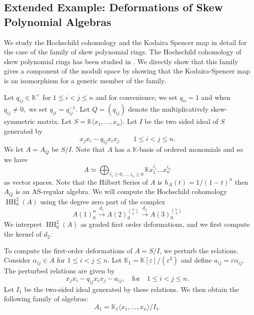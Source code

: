 \documentclass{amsart}
\def\HH{\operatorname{HH}}
\begin{document}
\subsection{Extended Example: Deformations of Skew Polynomial Algebras}
\label{toricfamily}
We study the Hochschild cohomology and the Kodaira Spencer map in detail for the case of the family of skew polynomial rings.  The Hochschild cohomology of skew polynomial rings has been studied in \cite{grimley2016hochschild, matviichuk2024creatingquantumprojectivespaces}. We directly show that this family gives a component of the moduli space by showing that the Kodaira-Spencer map is an isomorphism for a generic member of the family.

Let $q_{ij} \in \mathbb{K}^\times$ for $1 \leq i < j \leq n$ and
for convenience, we set $q_{ii}=1$ and when $q_{ij} \neq 0,$ we set $q_{ji}=q_{ij}^{-1}$. Let $Q=(q_{ij})$ denote the multiplicatively skew-symmetric matrix.
Let $S=\mathbb{K}\langle x_1,\ldots,x_n\rangle$.
Let $I$ be the two sided ideal of $S$ generated by
$$x_jx_i - q_{ij} x_ix_j\quad \quad 1 \leq i < j \leq n.$$
We let $A = A_Q$ be $S/I$.
Note that $A$ has a $\mathbb{K}$-basis of ordered monomials and so we have
$$ A \simeq \bigoplus_{i_1\geq 0,\ldots, i_n \geq 0} \mathbb{K} x_1^{i_1}\ldots x^{i_n}_n$$
as vector spaces.  Note that the Hilbert Series of $A$ is $h_A(t) = 1/(1-t)^n$  then $A_Q$ is an AS-regular algebra.
We will compute the Hochschild cohomology
$\HH^2_0(A)$ using the degree zero part of the complex
$$ A(1)^n_0 \stackrel{d_1}{\longrightarrow} A(2)^{\binom{n}{2}}_0 \stackrel{d_2}{\longrightarrow}
  A(3)^{\binom{n}{3}}_0 $$
  We interpret $\HH^2_0(A)$ as graded first order deformations, and we first compute the kernel of $d_2$.
  
To compute the first-order deformations of \( A = S/I \), we perturb the relations. Consider \( \alpha_{ij} \in A \) for \( 1 \leq i < j \leq n \). Let \( \mathbb{K}_1 = \mathbb{K}[\varepsilon]/(\varepsilon^2) \) and define \( a_{ij} = \varepsilon \alpha_{ij} \). The perturbed relations are given by
\[
x_j x_i - q_{ij} x_i x_j - a_{ij}, \quad \text{for} \quad 1 \leq i < j \leq n.
\]
Let \( I_1 \) be the two-sided ideal generated by these relations. We then obtain the following family of algebras:
\[
A_1 = \mathbb{K}_1\langle x_1, \dots, x_n \rangle / I_1.
\]
\end{document}
